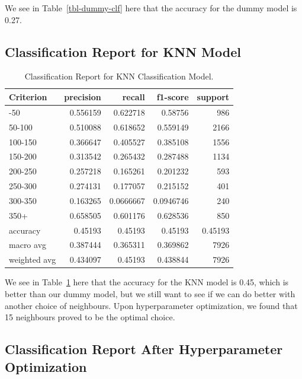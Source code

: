 \documentclass[
  letterpaper,
  DIV=11,
  numbers=noendperiod]{scrartcl}
\begin{document}
We see in Table~\ref{tbl-dummy-clf} here that the accuracy for the dummy
model is 0.27.

\subsection{Classification Report for KNN
Model}\label{classification-report-for-knn-model}

\begin{longtable}[]{@{}lrrrr@{}}

\caption{\label{tbl-knn-clf}Classification Report for KNN Classification
Model.}

\tabularnewline

\toprule\noalign{}
Criterion & precision & recall & f1-score & support \\
\midrule\noalign{}
\endhead
\bottomrule\noalign{}
\endlastfoot
0-50 & 0.556159 & 0.622718 & 0.58756 & 986 \\
50-100 & 0.510088 & 0.618652 & 0.559149 & 2166 \\
100-150 & 0.366647 & 0.405527 & 0.385108 & 1556 \\
150-200 & 0.313542 & 0.265432 & 0.287488 & 1134 \\
200-250 & 0.257218 & 0.165261 & 0.201232 & 593 \\
250-300 & 0.274131 & 0.177057 & 0.215152 & 401 \\
300-350 & 0.163265 & 0.0666667 & 0.0946746 & 240 \\
350+ & 0.658505 & 0.601176 & 0.628536 & 850 \\
accuracy & 0.45193 & 0.45193 & 0.45193 & 0.45193 \\
macro avg & 0.387444 & 0.365311 & 0.369862 & 7926 \\
weighted avg & 0.434097 & 0.45193 & 0.438844 & 7926 \\

\end{longtable}

We see in Table~\ref{tbl-knn-clf} here that the accuracy for the KNN
model is 0.45, which is better than our dummy model, but we still want
to see if we can do better with another choice of neighbours. Upon
hyperparameter optimization, we found that 15 neighbours proved to be
the optimal choice.

\subsection{Classification Report After Hyperparameter
Optimization}\label{classification-report-after-hyperparameter-optimization}
\end{document}
